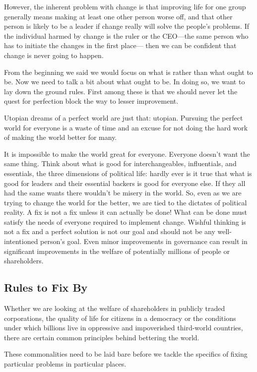 \documentclass[10pt]{article}
\begin{document}
{\large However, the inherent problem with change is that improving life for one
group generally means making at least one other person worse off, and that other
person is likely to be a leader if change really will solve the people's
problems. If the individual harmed by change is the ruler or the CEO---the same
person who has to initiate the changes in the first place--- then we can be
confident that change is never going to happen.}

{\large From the beginning we said we would focus on what is rather than what
ought to be. Now we need to talk a bit about what ought to be. In doing so, we
want to lay down the ground rules. First among these is that we should never let
the quest for perfection block the way to lesser improvement.}

{\large Utopian dreams of a perfect world are just that: utopian. Pursuing the
perfect world for everyone is a waste of time and an excuse for not doing the
hard work of making the world better for many.}

{\large It is impossible to make the world great for everyone. Everyone doesn't
want the same thing. Think about what is good for interchangeables, influentials,
and essentials, the three dimensions of political life: hardly ever is it true
that what is good for leaders and their essential backers is good for everyone
else. If they all had the same wants there wouldn't be misery in the world. So,
even as we are trying to change the world for the better, we are tied to the
dictates of political reality. A fix is not a fix unless it can actually be done!
What can be done must satisfy the needs of everyone required to implement change.
Wishful thinking is not a fix and a perfect solution is not our goal and should
not be any well-intentioned person's goal. Even minor improvements in governance
can result in significant improvements in the welfare of potentially millions of
people or shareholders.}

\subsection{Rules to Fix By}
{\large     }
{\large Whether we are looking at the welfare of shareholders in publicly traded
corporations, the quality of life for citizens in a democracy or the conditions
under which billions live in oppressive and impoverished third-world countries,
there are certain common principles behind bettering the world.}

{\large These commonalities need to be laid bare before we tackle the specifics
of fixing particular problems in particular places.}
\end{document}

